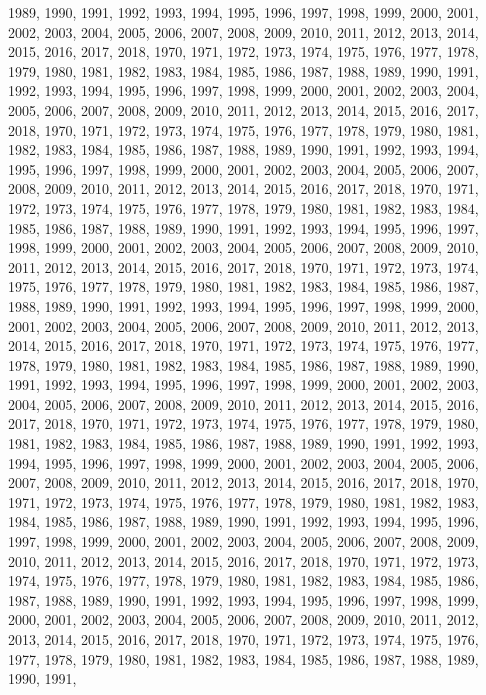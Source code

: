 \documentclass[
]{article}
\begin{document}
1989, 1990, 1991, 1992, 1993, 1994, 1995, 1996, 1997, 1998, 1999, 2000,
2001, 2002, 2003, 2004, 2005, 2006, 2007, 2008, 2009, 2010, 2011, 2012,
2013, 2014, 2015, 2016, 2017, 2018, 1970, 1971, 1972, 1973, 1974, 1975,
1976, 1977, 1978, 1979, 1980, 1981, 1982, 1983, 1984, 1985, 1986, 1987,
1988, 1989, 1990, 1991, 1992, 1993, 1994, 1995, 1996, 1997, 1998, 1999,
2000, 2001, 2002, 2003, 2004, 2005, 2006, 2007, 2008, 2009, 2010, 2011,
2012, 2013, 2014, 2015, 2016, 2017, 2018, 1970, 1971, 1972, 1973, 1974,
1975, 1976, 1977, 1978, 1979, 1980, 1981, 1982, 1983, 1984, 1985, 1986,
1987, 1988, 1989, 1990, 1991, 1992, 1993, 1994, 1995, 1996, 1997, 1998,
1999, 2000, 2001, 2002, 2003, 2004, 2005, 2006, 2007, 2008, 2009, 2010,
2011, 2012, 2013, 2014, 2015, 2016, 2017, 2018, 1970, 1971, 1972, 1973,
1974, 1975, 1976, 1977, 1978, 1979, 1980, 1981, 1982, 1983, 1984, 1985,
1986, 1987, 1988, 1989, 1990, 1991, 1992, 1993, 1994, 1995, 1996, 1997,
1998, 1999, 2000, 2001, 2002, 2003, 2004, 2005, 2006, 2007, 2008, 2009,
2010, 2011, 2012, 2013, 2014, 2015, 2016, 2017, 2018, 1970, 1971, 1972,
1973, 1974, 1975, 1976, 1977, 1978, 1979, 1980, 1981, 1982, 1983, 1984,
1985, 1986, 1987, 1988, 1989, 1990, 1991, 1992, 1993, 1994, 1995, 1996,
1997, 1998, 1999, 2000, 2001, 2002, 2003, 2004, 2005, 2006, 2007, 2008,
2009, 2010, 2011, 2012, 2013, 2014, 2015, 2016, 2017, 2018, 1970, 1971,
1972, 1973, 1974, 1975, 1976, 1977, 1978, 1979, 1980, 1981, 1982, 1983,
1984, 1985, 1986, 1987, 1988, 1989, 1990, 1991, 1992, 1993, 1994, 1995,
1996, 1997, 1998, 1999, 2000, 2001, 2002, 2003, 2004, 2005, 2006, 2007,
2008, 2009, 2010, 2011, 2012, 2013, 2014, 2015, 2016, 2017, 2018, 1970,
1971, 1972, 1973, 1974, 1975, 1976, 1977, 1978, 1979, 1980, 1981, 1982,
1983, 1984, 1985, 1986, 1987, 1988, 1989, 1990, 1991, 1992, 1993, 1994,
1995, 1996, 1997, 1998, 1999, 2000, 2001, 2002, 2003, 2004, 2005, 2006,
2007, 2008, 2009, 2010, 2011, 2012, 2013, 2014, 2015, 2016, 2017, 2018,
1970, 1971, 1972, 1973, 1974, 1975, 1976, 1977, 1978, 1979, 1980, 1981,
1982, 1983, 1984, 1985, 1986, 1987, 1988, 1989, 1990, 1991, 1992, 1993,
1994, 1995, 1996, 1997, 1998, 1999, 2000, 2001, 2002, 2003, 2004, 2005,
2006, 2007, 2008, 2009, 2010, 2011, 2012, 2013, 2014, 2015, 2016, 2017,
2018, 1970, 1971, 1972, 1973, 1974, 1975, 1976, 1977, 1978, 1979, 1980,
1981, 1982, 1983, 1984, 1985, 1986, 1987, 1988, 1989, 1990, 1991, 1992,
1993, 1994, 1995, 1996, 1997, 1998, 1999, 2000, 2001, 2002, 2003, 2004,
2005, 2006, 2007, 2008, 2009, 2010, 2011, 2012, 2013, 2014, 2015, 2016,
2017, 2018, 1970, 1971, 1972, 1973, 1974, 1975, 1976, 1977, 1978, 1979,
1980, 1981, 1982, 1983, 1984, 1985, 1986, 1987, 1988, 1989, 1990, 1991,
\end{document}
